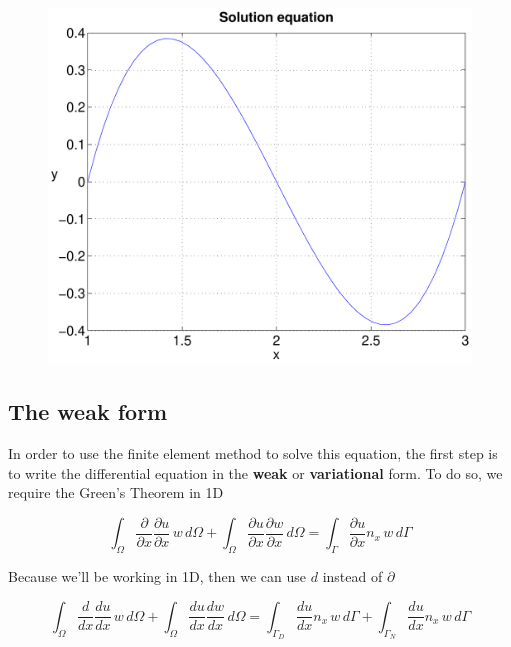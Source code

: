 \documentclass[letterpaper,10pt]{article}
\begin{document}
\begin{figure}
\includegraphics{figures/1_01_Objective_function.pdf}
\end{figure}



\subsection{The weak form}

In order to use the finite element method to solve this equation, the first step is to write the differential equation in the \textbf{weak} or \textbf{variational} form. To do so, we require the Green's Theorem in 1D

\[
\int_{\Omega} \frac{\partial}{\partial x} \frac{\partial u}{\partial x} \, w \, d\Omega + \int_{\Omega} \frac{\partial u}{\partial x} \frac{\partial w}{\partial x} \, d\Omega = \int_{\Gamma} \frac{\partial u}{\partial x} n_x \, w \, d\Gamma
\]

Because we'll be working in 1D, then we can use $d$ instead of $\partial$



\begin{equation}
\int_{\Omega} \frac{d}{d x} \frac{d u}{d x} \, w \, d\Omega + \int_{\Omega} \frac{d u}{d x} \frac{d w}{d x} \, d\Omega = \int_{\Gamma_D} \frac{d u}{d x} n_x \, w \, d\Gamma + \int_{\Gamma_N} \frac{d u}{d x} n_x \, w \, d\Gamma
\label{eq:GreenTheorem_1D}
\end{equation}
\end{document}
